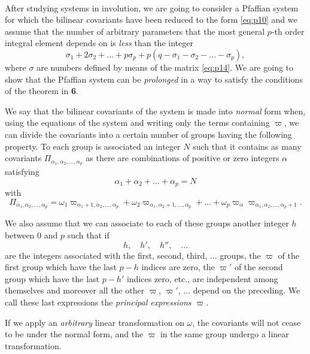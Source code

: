 \documentclass[leqno,11pt]{book}
\theoremstyle{shape1}
\theoremstyle{shapesmall}
\newcommand{\vp}{\varpi}
\begin{document}
\paragraph{}
\label{sec:p10}
After studying systems in involution, we are going to consider a Pfaffian system for which the bilinear covariants have been reduced to the form \eqref{eq:p10} and we assume that the number of arbitrary parameters that the most general $p$-th order integral element depends on is \emph{less} than the integer
\[
\sigma_{1}+2\sigma_{2}+\dots+p\sigma_{p}+p(q-\sigma_{1}-\sigma_{2}-\dots-\sigma_{p}),
\]
where $\sigma$ are numbers defined by means of the matrix \eqref{eq:p14}. We are going to show that the Pfaffian system can be \emph{prolonged} in a way to satisfy the conditions of the theorem in \textsection\textbf{6}.

We say that the bilinear covariants of the system is made into \emph{normal} form when, using the equations of the system and writing only the terms containing $\vp$, we can divide the covariants into a certain number of groups having the following property. To each group is associated an integer $N$ such that it contains as many covariants $\Pi_{\alpha_{1},\alpha_{2},\dots,\alpha_{p}}$ as there are combinations of positive or zero integers $\alpha$ satisfying
\[
\alpha_{1}+\alpha_{2}+\dots+\alpha_{p}=N
\]
with
\[
\Pi_{\alpha_{1},\alpha_{2},\dots,\alpha_{p}}=\omega_{1}\vp_{\alpha_{1}+1,\alpha_{2},\dots,\alpha_{p}}+\omega_{2}\vp_{\alpha_{1},\alpha_{2}+1,\dots,\alpha_{p}}+\dots+\omega_{p}\vp_{\alpha}\vp_{\alpha_{1},\alpha_{2},\dots,\alpha_{p}+1}.
\]

We also assume that we can associate to each of these groups another integer $h$ between $0$ and $p$ such that if
\[
h,\quad h',\quad h'',\quad\dots
\]
are the integers associated with the first, second, third, $\dots$ groups, the $\vp$ of the first group which have the last $p-h$ indices are zero, the $\vp'$ of the second group which have the last $p-h'$ indices zero, etc., are independent among themselves and moreover all the other $\vp$, $\vp'$, $\dots$ depend on the preceding. We call these last expressions the \emph{principal expressions $\vp$.}

If we apply an \emph{arbitrary} linear transformation on $\omega$, the covariants will not cease to be under the normal form, and the $\vp$ in the same group undergo a linear transformation.
\end{document}
